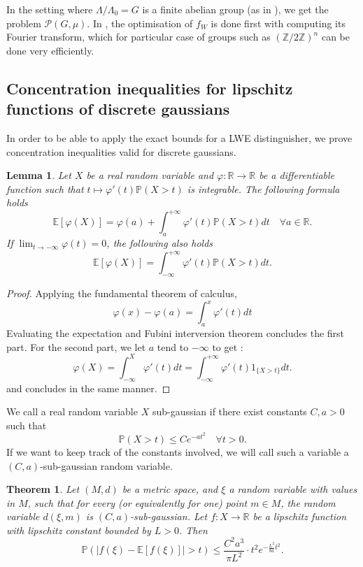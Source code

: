 \documentclass{article}
\newtheorem{theorem}{Theorem}
\newtheorem{lemma}{Lemma}
\begin{document}
In the setting where $\Lambda / \Lambda_0 = G$ is a finite abelian group (as in \cite{ducas2023does}), we get the problem $\mathcal P(G,\mu)$. In \cite{ducas2023does}, the optimisation of $f_W$ is done first with computing its Fourier transform, which for particular case of groups such as $(\mathbb Z / 2 \mathbb Z)^n$ can be done very efficiently. 

\subsection{Concentration inequalities for lipschitz functions of discrete gaussians}
In order to be able to apply the exact bounds for a LWE distinguisher, we prove concentration inequalities valid for discrete gaussians. 

\begin{lemma}
Let $X$ be a real random variable and $\varphi : \mathbb R \rightarrow \mathbb R$ be a differentiable function such that $t\mapsto \varphi'(t)\mathbb P(X>t)$ is integrable. The following formula holds
$$\mathbb E [\varphi(X)] = \varphi(a) + \int_{a}^{+\infty} \varphi'(t)\mathbb P(X > t) dt \quad \forall a \in \mathbb R.$$
If $\lim_{t\rightarrow -\infty}\varphi(t) =0$, the following also holds
$$\mathbb E [\varphi(X)] = \int_{-\infty}^{+\infty} \varphi'(t)\mathbb P(X > t) dt.$$
\end{lemma}

\begin{proof}
Applying the fundamental theorem of calculus,
$$\varphi(x)-\varphi(a) = \int_a^x\varphi'(t)dt$$
Evaluating the expectation and Fubini interversion theorem concludes the first part.
For the second part, we let $a$ tend to $-\infty$ to get :
$$\varphi(X) = \int_{-\infty}^X\varphi'(t)dt = \int_{-\infty}^{+\infty} \varphi'(t) 1_{\{X > t\}} dt.$$
and concludes in the same manner.
\end{proof}

We call a real random variable $X$ sub-gaussian if there exist constants $C , a>0$ such that 
$$\mathbb P( X > t ) \leq Ce^{-at^2} \quad \forall t >0.$$ 
If we want to keep track of the constants involved, we will call such a variable a $(C,a)$-sub-gaussian random variable.

\begin{theorem}
Let $(M,d)$ be a metric space, and $\xi$ a random variable with values in $M$, such that for every (or equivalently for one) point $m\in M$, the random variable $d(\xi, m)$ is $(C,a)$-sub-gaussian. Let $f : X\rightarrow \mathbb R$ be a lipschitz function with lipschitz constant bounded by $L>0$. Then  
$$\mathbb P(|f(\xi)  - \mathbb E[f(\xi)]| > t) \leq   \frac{C^2a^3}{\pi L^2} \cdot t^2 e^{-\frac{ L^2}{8a}t^2} .$$
\end{theorem}
\end{document}
